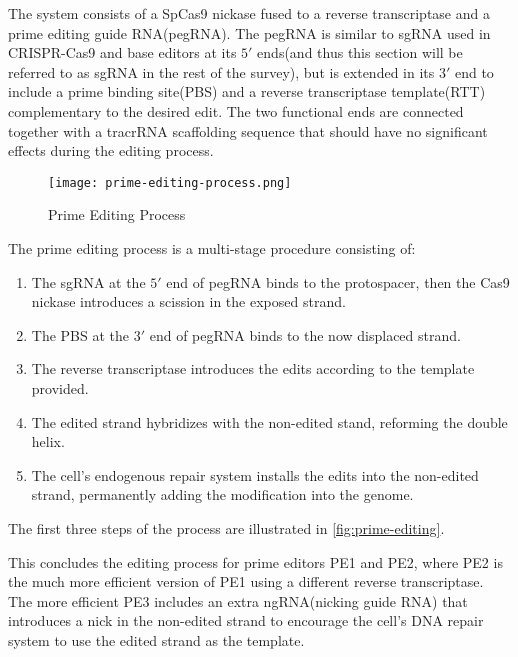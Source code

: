 \documentclass[12pt]{article}
\begin{document}
The system consists of a SpCas9 nickase fused to a reverse transcriptase and a prime editing guide RNA(pegRNA). The pegRNA is similar to sgRNA used in CRISPR-Cas9 and base editors at its $5'$ ends(and thus this section will be referred to as sgRNA in the rest of the survey), but is extended in its $3'$ end to include a prime binding site(PBS) and a reverse transcriptase template(RTT) complementary to the desired edit. The two functional ends are connected together with a tracrRNA scaffolding sequence that should have no significant effects during the editing process.

\begin{figure}[ht]
    \centering
    \texttt{[image: prime-editing-process.png]}
    \caption{Prime Editing Process\cite{liuPrimeEditingPrecise2023}}
    \label{fig:prime-editing}
\end{figure}

The prime editing process is a multi-stage procedure consisting of\cite{liudavidr.SearchandreplaceGenomeEditing2019}:
\begin{enumerate}
    \item The sgRNA at the $5'$ end of pegRNA binds to the protospacer, then the Cas9 nickase introduces a scission in the exposed strand.
    \item The PBS at the $3'$ end of pegRNA binds to the now displaced strand.
    \item The reverse transcriptase introduces the edits according to the template provided.
    \item The edited strand hybridizes with the non-edited stand, reforming the double helix.
    \item The cell's endogenous repair system installs the edits into the non-edited strand, permanently adding the modification into the genome.
\end{enumerate}

The first three steps of the process are illustrated in \autoref{fig:prime-editing}. 


This concludes the editing process for prime editors PE1 and PE2, where PE2 is the much more efficient version of PE1 using a different reverse transcriptase\cite{liudavidr.SearchandreplaceGenomeEditing2019}. 
The more efficient PE3 includes an extra ngRNA(nicking guide RNA) that introduces a nick in the non-edited strand to encourage the cell's DNA repair system to use the edited strand as the template\cite{liudavidr.SearchandreplaceGenomeEditing2019}. 
\end{document}

